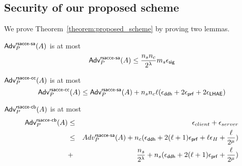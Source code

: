 \subsection{Security of our proposed scheme} \label{sec:quic_proof}

We prove Theorem~\ref{theorem:proposed_scheme} by proving two lemmas.

\begin{lemma} \label{lemma:proposed_scheme_rsacce-sa}
 $\mathsf{Adv}^{\mathsf{rsacce\textsc{-} sa}}_{P}(A)$ is at most
 \begin{equation}
  \mathsf{Adv}^{\mathsf{rsacce\textsc{-} sa}}_{P}(A) \leq \frac{n_s n_c}{2^{\lambda}} m_s \epsilon_{\mathsf{sig}}
 \end{equation}
\end{lemma}
%


\begin{lemma} \label{lemma:proposed_scheme_rsacce-cc}
 $\mathsf{Adv}^{\mathsf{rsacce\textsc{-} cc}}_{P}(A)$ is at most
 \begin{equation}
  \mathsf{Adv}^{\mathsf{rsacce\textsc{-} cc}}_{P}(A) \leq \mathsf{Adv}^{\mathsf{rsacce\textsc{-} sa}}_{P}(A) + n_sn_c\ell(\epsilon_{\mathsf{ddh}} + 2\epsilon_{\mathsf{prf}} + 2\epsilon_{\mathsf{LHAE}})
 \end{equation}
\end{lemma}
%


\begin{lemma} \label{lemma:proposed_scheme_tls_rsacce-cb}
 $\mathsf{Adv}^{\mathsf{rsacce\textsc{-} cb}}_{P}(A)$ is at most
 \begin{eqnarray}
  \mathsf{Adv}^{\mathsf{rsacce\textsc{-} cb}}_{P}(A) &\leq& \epsilon_{client} + \epsilon_{server} \nonumber \\
  &\leq& Adv^{\mathsf{rsacce\textsc{-} sa}}_{P}(A) + n_c(\epsilon_{\mathsf{ddh}} + 2(\ell + 1)\epsilon_{\mathsf{prf}} + \ell\epsilon_{H} + \frac{\ell}{2^{\mu}}) \nonumber \\
   &+& \frac{n_s}{2^{\lambda}} + n_s(\epsilon_{\mathsf{ddh}} + 2(\ell+1)\epsilon_{\mathsf{prf}} + \frac{\ell}{2^{\mu}})
 \end{eqnarray}
\end{lemma}
%
